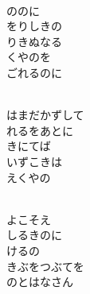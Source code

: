 \documentclass[10pt,b5j]{tarticle} %
\begin{document}
\begin{enumerate}
\begin{minipage}[c]{\blocksize}
    \end{minipage}
    \begin{minipage}[c]{\blocksize}
        
        \vspace{\linespace}
        \item~\\
        ののに\\
        をりしきの\\
        りきぬなる\\
        くやのを\\
        ごれるのに
        
    \end{minipage}
    \begin{minipage}[c]{\blocksize}
        
        \vspace{\linespace}
        \item~\\
        はまだかずして\\
        れるをあとに\\
        きにてば\\
        いずこきは\\
        えくやの
        
    \end{minipage}
    \begin{minipage}[c]{\blocksize}
        
        \vspace{\linespace}
        \item~\\
        よこそえ\\
        しるきのに\\
        けるの\\
        きぶをつぶてを\\
        のとはなさん
        
    \end{minipage}
    \begin{minipage}[c]{\blocksize}
        

\end{minipage}
\end{enumerate}
\end{document}
